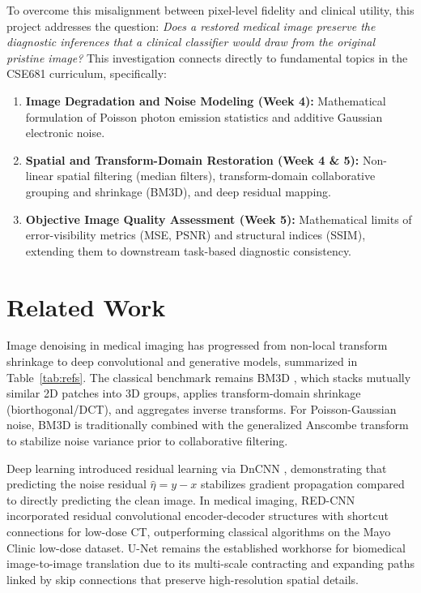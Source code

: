 \documentclass[11pt]{article}
\begin{document}
To overcome this misalignment between pixel-level fidelity and clinical utility, this project addresses the question: \emph{Does a restored medical image preserve the diagnostic inferences that a clinical classifier would draw from the original pristine image?} This investigation connects directly to fundamental topics in the CSE681 curriculum, specifically:
\begin{enumerate}[leftmargin=*,noitemsep]
  \item \textbf{Image Degradation and Noise Modeling (Week 4):} Mathematical formulation of Poisson photon emission statistics and additive Gaussian electronic noise.
  \item \textbf{Spatial and Transform-Domain Restoration (Week 4 \& 5):} Non-linear spatial filtering (median filters), transform-domain collaborative grouping and shrinkage (BM3D), and deep residual mapping.
  \item \textbf{Objective Image Quality Assessment (Week 5):} Mathematical limits of error-visibility metrics (MSE, PSNR) and structural indices (SSIM), extending them to downstream task-based diagnostic consistency.
\end{enumerate}

\section{Related Work}
\label{sec:related}
Image denoising in medical imaging has progressed from non-local transform shrinkage to deep convolutional and generative models, summarized in Table~\ref{tab:refs}. The classical benchmark remains BM3D \citep{dabov2007bm3d}, which stacks mutually similar 2D patches into 3D groups, applies transform-domain shrinkage (biorthogonal/DCT), and aggregates inverse transforms. For Poisson-Gaussian noise, BM3D is traditionally combined with the generalized Anscombe transform \citep{makitalo2011anscombe} to stabilize noise variance prior to collaborative filtering.

Deep learning introduced residual learning via DnCNN \citep{zhang2017dncnn}, demonstrating that predicting the noise residual $\hat{\eta} = y - x$ stabilizes gradient propagation compared to directly predicting the clean image. In medical imaging, RED-CNN \citep{chen2017redcnn} incorporated residual convolutional encoder-decoder structures with shortcut connections for low-dose CT, outperforming classical algorithms on the Mayo Clinic low-dose dataset. U-Net \citep{ronneberger2015unet} remains the established workhorse for biomedical image-to-image translation due to its multi-scale contracting and expanding paths linked by skip connections that preserve high-resolution spatial details.
\end{document}
